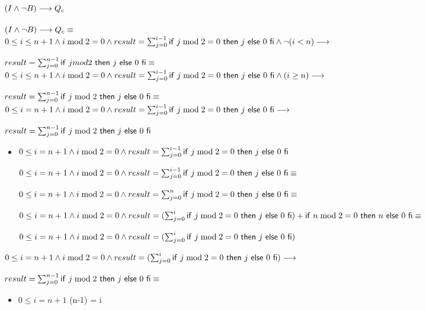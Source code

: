 \documentclass{article}
\begin{document}
\subsubsection*{$(I \wedge \neg B) \longrightarrow Q_{c}$}

$(I \wedge \neg B) \longrightarrow Q_{c} \equiv$ \\

$0 \leq i \leq n+1 \wedge i \bmod 2 = 0 \wedge result = \sum_{j=0}^{i-1} \mathsf{if}\ j \bmod 2 = 0\ \mathsf{then}\ j\ \mathsf{else}\ 0\ \mathsf{fi} \wedge 
    \neg (i < n)
    \longrightarrow$

$result = \sum_{j=0}^{n-1} \mathsf{if}\ j mod 2\ \mathsf{then}\ j\ \mathsf{else}\ 0\ \mathsf{fi} \equiv$ \\

$0 \leq i \leq n+1 \wedge i \bmod 2 = 0 \wedge result = \sum_{j=0}^{i-1} \mathsf{if}\ j \bmod 2 = 0\ \mathsf{then}\ j\ \mathsf{else}\ 0\ \mathsf{fi} \wedge 
    (i \geq n)
    \longrightarrow$

$result = \sum_{j=0}^{n-1} \mathsf{if}\ j \bmod 2\ \mathsf{then}\ j\ \mathsf{else}\ 0\ \mathsf{fi} \equiv$ \\

$0 \leq i = n+1 \wedge i \bmod 2 = 0 \wedge result = \sum_{j=0}^{i-1} \mathsf{if}\ j \bmod 2 = 0\ \mathsf{then}\ j\ \mathsf{else}\ 0\ \mathsf{fi}
    \longrightarrow$

$result = \sum_{j=0}^{n-1} \mathsf{if}\ j \bmod 2\ \mathsf{then}\ j\ \mathsf{else}\ 0\ \mathsf{fi}$

\begin{itemize}
    \item $ 0 \leq i = n+1 \wedge i \bmod 2 = 0 \wedge result = \sum_{j=0}^{i-1} \mathsf{if}\ j \bmod 2 = 0\ \mathsf{then}\ j\ \mathsf{else}\ 0\ \mathsf{fi} $

    $ 0 \leq i = n+1 \wedge i \bmod 2 = 0 \wedge result = \sum_{j=0}^{i-1} \mathsf{if}\ j \bmod 2 = 0\ \mathsf{then}\ j\ \mathsf{else}\ 0\ \mathsf{fi} \equiv$

    $ 0 \leq i = n+1 \wedge i \bmod 2 = 0 \wedge result = \sum_{j=0}^{n} \mathsf{if}\ j \bmod 2 = 0\ \mathsf{then}\ j\ \mathsf{else}\ 0\ \mathsf{fi} \equiv$

    $0 \leq i = n+1 \wedge i \bmod 2 = 0 \wedge result = (\sum_{j=0}^{i} \mathsf{if}\ j \bmod 2 = 0\ \mathsf{then}\ j\ \mathsf{else}\ 0\ \mathsf{fi}) + \mathsf{if}\ n \bmod 2 = 0\ \mathsf{then}\ n\ \mathsf{else}\ 0\ \mathsf{fi} \equiv$

    $0 \leq i = n+1 \wedge i \bmod 2 = 0 \wedge result = (\sum_{j=0}^{i} \mathsf{if}\ j \bmod 2 = 0\ \mathsf{then}\ j\ \mathsf{else}\ 0\ \mathsf{fi})$

\end{itemize}

$0 \leq i = n+1 \wedge i \bmod 2 = 0 \wedge result = (\sum_{j=0}^{i} \mathsf{if}\ j \bmod 2 = 0\ \mathsf{then}\ j\ \mathsf{else}\ 0\ \mathsf{fi}) \longrightarrow$

$result = \sum_{j=0}^{n-1} \mathsf{if}\ j \bmod 2\ \mathsf{then}\ j\ \mathsf{else}\ 0\ \mathsf{fi} \equiv$

\begin{itemize}
    \item $0 \leq i = n+1$ \implica (n-1) = i
\end{itemize}
\end{document}
